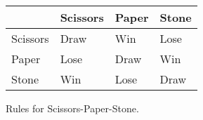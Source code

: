 \begin{tabular}{|l|l|l|l|}
\hline
         & Scissors & Paper & Stone \\ \hline
Scissors & Draw     & Win   & Lose  \\ \hline
Paper    & Lose     & Draw  & Win   \\ \hline
Stone    & Win      & Lose  & Draw  \\ \hline
\end{tabular}
\caption{Rules for Scissors-Paper-Stone.}
